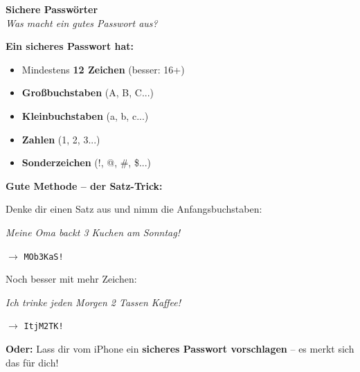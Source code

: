 \documentclass[a4paper,landscape,8pt]{extarticle}
\begin{document}
\begin{minipage}[t]{0.32\linewidth}
\vspace{2mm}

\begin{center}
\end{center}

\end{minipage}%
\hfill%
\begin{minipage}[t]{0.32\linewidth}
\begin{center}
\colorbox{lockgreen!10}{%
\begin{minipage}{0.95\linewidth}
\vspace{2mm}
\begin{center}
{\Large\bfseries\textcolor{lockgreen}{Sichere Passwörter}}\\[1pt]
{\footnotesize\itshape Was macht ein gutes Passwort aus?}
\end{center}
\vspace{2mm}
\end{minipage}%
}
\end{center}

\vspace{1mm}

\textbf{Ein sicheres Passwort hat:}
\begin{itemize}
\item Mindestens \textbf{12 Zeichen} (besser: 16+)
\item \textbf{Großbuchstaben} (A, B, C...)
\item \textbf{Kleinbuchstaben} (a, b, c...)
\item \textbf{Zahlen} (1, 2, 3...)
\item \textbf{Sonderzeichen} (!, @, \#, \$...)
\end{itemize}

\textbf{Gute Methode -- der Satz-Trick:}

Denke dir einen Satz aus und nimm die Anfangsbuchstaben:

\glqq \textit{Meine Oma backt 3 Kuchen am Sonntag!}\grqq{}

$\rightarrow$ \texttt{MOb3KaS!}

Noch besser mit mehr Zeichen:

\glqq \textit{Ich trinke jeden Morgen 2 Tassen Kaffee!}\grqq{}

$\rightarrow$ \texttt{ItjM2TK!}

\vspace{2mm}

\textbf{Oder:} Lass dir vom iPhone ein \textbf{sicheres Passwort vorschlagen} -- es merkt sich das für dich!

\end{minipage}%
\end{document}
